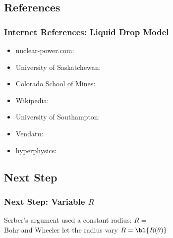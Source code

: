 \subsection{References}
\begin{frame}\frametitle{Internet References: Liquid Drop Model\jumpLittle}
\begin{itemize}
	\item nuclear-power.com: \href{https://www.nuclear-power.com/nuclear-power/fission/liquid-drop-model/}{}
	\item University of Saskatchewan: \href{http://nucleus.usask.ca/ftp/pub/rob/PHYS-452-Topics/Part-04\%20Liquid\%20Drop\%20Model.pdf}{}
	\item Colorado School of Mines: \href{http://inside.mines.edu/~kleach/PHGN422/lectures/Lecture5.pdf}{}
	\item Wikipedia: \href{https://en.wikipedia.org/wiki/Semi-empirical\_mass\_formula}{}
	\item University of Southampton: \href{http://www.personal.soton.ac.uk/ab1u06/teaching/phys3002/course/04\_liquiddrop.pdf}{}
	\item Vendatu: \href{https://www.vedantu.com/physics/liquid-drop-model}{}
	\item hyperphysics: \href{http://hyperphysics.gsu.edu/hbase/Nuclear/liqdrop.html}{}
\end{itemize}
\end{frame}

\subsection{Next Step}
%
\begin{frame}\frametitle{Next Step: Variable $R$\jumpBig}
Serber's argument used a constant radius: $R=\,$\\
%
Bohr and Wheeler let the radius vary $R=\bl{R(\theta)}$
\end{frame}



\endinput  %
